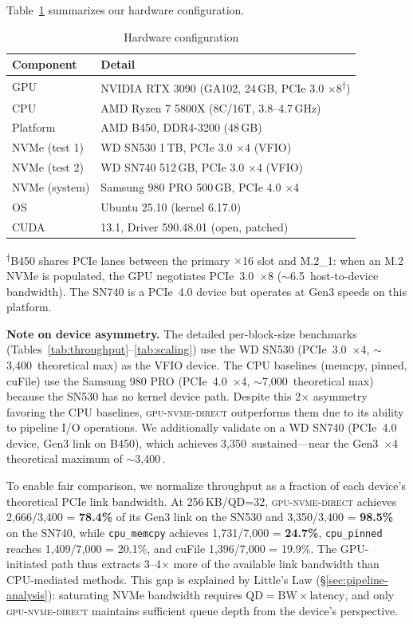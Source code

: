 \documentclass{article}
\newcommand{\sysname}{\textsc{gpu-nvme-direct}}
\newcommand{\MBs}{\,\text{MB/s}}
\newcommand{\GBs}{\,\text{GB/s}}
\begin{document}
Table~\ref{tab:hardware} summarizes our hardware configuration.

\begin{table}[t]
\centering
\caption{Hardware configuration}
\label{tab:hardware}
\small
\begin{tabular}{ll}
\toprule
\textbf{Component} & \textbf{Detail} \\
\midrule
GPU & NVIDIA RTX 3090 (GA102, 24\,GB, PCIe 3.0 $\times$8\textsuperscript{$\dagger$}) \\
CPU & AMD Ryzen 7 5800X (8C/16T, 3.8--4.7\,GHz) \\
Platform & AMD B450, DDR4-3200 (48\,GB) \\
NVMe (test 1) & WD SN530 1\,TB, PCIe 3.0 $\times$4 (VFIO) \\
NVMe (test 2) & WD SN740 512\,GB, PCIe 3.0 $\times$4 (VFIO) \\
NVMe (system) & Samsung 980 PRO 500\,GB, PCIe 4.0 $\times$4 \\
OS & Ubuntu 25.10 (kernel 6.17.0) \\
CUDA & 13.1, Driver 590.48.01 (open, patched) \\
\bottomrule
\end{tabular}

\smallskip
\noindent\textsuperscript{$\dagger$}B450 shares PCIe lanes between the primary
$\times$16 slot and M.2\_1: when an M.2 NVMe is populated, the GPU
negotiates PCIe~3.0~$\times$8 ($\sim$6.5\GBs{} host-to-device bandwidth).
The SN740 is a PCIe~4.0 device but operates at Gen3 speeds on this platform.
\end{table}

\textbf{Note on device asymmetry.} The detailed per-block-size benchmarks
(Tables~\ref{tab:throughput}--\ref{tab:scaling}) use the WD SN530
(PCIe~3.0~$\times$4, $\sim$3{,}400\MBs{} theoretical max) as the VFIO
device. The CPU baselines (memcpy, pinned, cuFile) use the Samsung 980 PRO
(PCIe~4.0~$\times$4, $\sim$7{,}000\MBs{} theoretical max) because the SN530 has no
kernel device path. Despite this 2$\times$ asymmetry favoring the CPU baselines,
\sysname{} outperforms them due to its ability to pipeline I/O operations.
We additionally validate on a WD SN740 (PCIe~4.0 device, Gen3 link on B450),
which achieves 3{,}350\MBs{} sustained---near the Gen3~$\times$4 theoretical
maximum of $\sim$3{,}400\MBs{}.

To enable fair comparison, we normalize throughput as a fraction of each device's
theoretical PCIe link bandwidth. At 256\,KB/QD=32, \sysname{} achieves
2{,}666/3{,}400 = \textbf{78.4\%} of its Gen3 link on the SN530 and
3{,}350/3{,}400 = \textbf{98.5\%} on the SN740, while \texttt{cpu\_memcpy}
achieves 1{,}731/7{,}000 = \textbf{24.7\%}, \texttt{cpu\_pinned} reaches
1{,}409/7{,}000 = 20.1\%, and cuFile 1{,}396/7{,}000 = 19.9\%. The GPU-initiated
path thus extracts 3--4$\times$ more of the available link bandwidth than
CPU-mediated methods. This gap is explained by Little's Law
(\S\ref{sec:pipeline-analysis}): saturating NVMe bandwidth requires
$\text{QD} = \text{BW} \times \text{latency}$, and only \sysname{} maintains
sufficient queue depth from the device's perspective.
\end{document}
